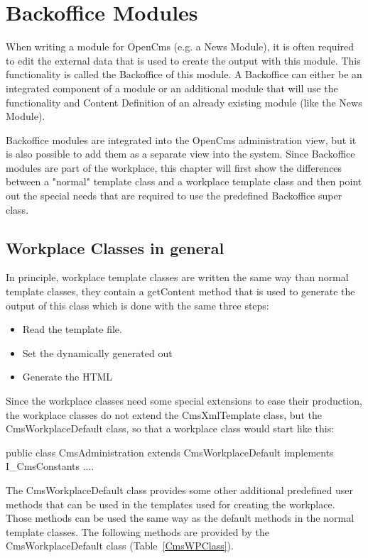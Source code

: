 \chapter {Backoffice Modules}
When writing a module for OpenCms (e.g. a News Module), it is often
required to edit the external data that is used to create the output
with this module. This functionality is called the Backoffice of this
module. A Backoffice can either be an integrated component of a module
or an additional module that will use the functionality and Content
Definition of an already existing module (like the News Module).

Backoffice modules are integrated into the OpenCms administration view,
but it is also possible to add them as a separate view into the system.
Since Backoffice modules are part of the workplace, this chapter will
first show the differences between a {\class "normal"} template class and a
workplace template class and then point out the special needs that are
required to use the predefined Backoffice super class.

\section {Workplace Classes in general}
In principle, workplace template classes are written the same way than
normal template classes, they contain a getContent method that is used
to generate the output of this class which is done with the same three
steps:
\begin{itemize}
\item Read the template file.
\item Set the dynamically generated out
\item Generate the HTML
\end{itemize}

Since the workplace classes need some special extensions to ease their
production, the workplace classes do not extend the CmsXmlTemplate
class, but the CmsWorkplaceDefault class, so that a workplace class
would start like this:
\begin{java}
public class CmsAdministration extends CmsWorkplaceDefault implements
I\_CmsConstants {....}
\end{java}

The {\class CmsWorkplaceDefault} class provides some other additional predefined
user methods that can be used in the templates used for creating the
workplace. Those methods can be used the same way as the default methods
in the normal template classes. The following methods are provided by
the {\class CmsWorkplaceDefault} class (Table~\ref{CmsWPClass}).


